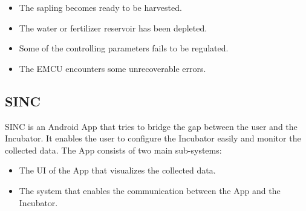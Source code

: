 \documentclass[../../main]{subfiles}
\begin{document}
\begin{itemize}
    \item The sapling becomes ready to be harvested.
    \item The water or fertilizer reservoir has been depleted.
    \item Some of the controlling parameters fails to be regulated.
    \item The EMCU encounters some unrecoverable errors.
\end{itemize}

\subsection{SINC}

SINC is an Android App that tries to bridge the gap between the user and the
Incubator. It enables the user to configure the Incubator easily and monitor
the collected data. The App consists of two main sub-systems:

\begin{itemize}
    \item The UI of the App that visualizes the collected data.
    \item The system that enables the communication between the App and the
        Incubator.
\end{itemize}
\end{document}

